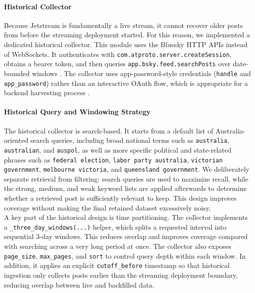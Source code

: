 \paragraph{Historical Collector}
Because Jetstream is fundamentally a live stream, it cannot recover older posts from before the streaming deployment started. For this reason, we implemented a dedicated historical collector. This module uses the Bluesky HTTP APIs instead of WebSockets. It authenticates with \texttt{com.atproto.server.createSession}, obtains a bearer token, and then queries \texttt{app.bsky.feed.searchPosts} over date-bounded windows \cite{bluesky2026createsession,bluesky2026searchposts}. The collector uses app-password-style credentials (\texttt{handle} and \texttt{app\_password}) rather than an interactive OAuth flow, which is appropriate for a backend harvesting process \cite{atproto2026auth,bluesky2026apihosts,bluesky2026createsession}.
\\

\paragraph{Historical Query and Windowing Strategy}
The historical collector is search-based. It starts from a default list of Australia-oriented search queries, including broad national terms such as \texttt{australia}, \texttt{australian}, and \texttt{auspol}, as well as more specific political and state-related phrases such as \texttt{federal election}, \texttt{labor party australia}, \texttt{victorian government}, \texttt{melbourne victoria}, and \texttt{queensland government}. We deliberately separate retrieval from filtering: search queries are used to maximize recall, while the strong, medium, and weak keyword lists are applied afterwards to determine whether a retrieved post is sufficiently relevant to keep. This design improves coverage without making the final retained dataset excessively noisy.
\\

A key part of the historical design is time partitioning. The collector implements a \texttt{\_three\_day\_windows(...)} helper, which splits a requested interval into sequential 3-day windows. This reduces overlap and improves coverage compared with searching across a very long period at once. The collector also exposes \texttt{page\_size}, \texttt{max\_pages}, and \texttt{sort} to control query depth within each window. In addition, it applies an explicit \texttt{cutoff\_before} timestamp so that historical ingestion only collects posts earlier than the streaming deployment boundary, reducing overlap between live and backfilled data.

